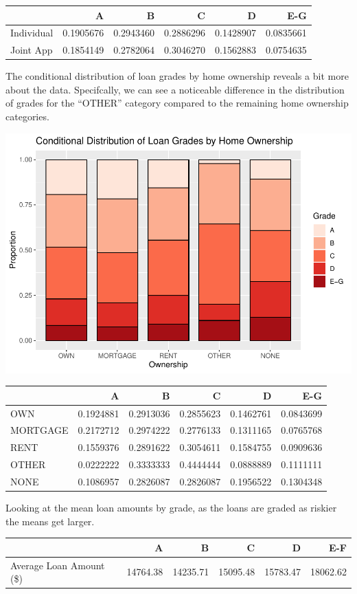 \documentclass[11pt,]{article}
\begin{document}
\begin{longtable}[]{@{}lrrrrr@{}}
\toprule
& A & B & C & D & E-G\tabularnewline
\midrule
\endhead
Individual & 0.1905676 & 0.2943460 & 0.2886296 & 0.1428907 &
0.0835661\tabularnewline
Joint App & 0.1854149 & 0.2782064 & 0.3046270 & 0.1562883 &
0.0754635\tabularnewline
\bottomrule
\end{longtable}

The conditional distribution of loan grades by home ownership reveals a
bit more about the data. Specifcally, we can see a noticeable difference
in the distribution of grades for the ``OTHER'' category compared to the
remaining home ownership categories.

\includegraphics{An-Analysis-of-LendingClub-Loan-Grades_files/figure-latex/unnamed-chunk-3-1.pdf}

\begin{longtable}[]{@{}lrrrrr@{}}
\toprule
& A & B & C & D & E-G\tabularnewline
\midrule
\endhead
OWN & 0.1924881 & 0.2913036 & 0.2855623 & 0.1462761 &
0.0843699\tabularnewline
MORTGAGE & 0.2172712 & 0.2974222 & 0.2776133 & 0.1311165 &
0.0765768\tabularnewline
RENT & 0.1559376 & 0.2891622 & 0.3054611 & 0.1584755 &
0.0909636\tabularnewline
OTHER & 0.0222222 & 0.3333333 & 0.4444444 & 0.0888889 &
0.1111111\tabularnewline
NONE & 0.1086957 & 0.2826087 & 0.2826087 & 0.1956522 &
0.1304348\tabularnewline
\bottomrule
\end{longtable}

Looking at the mean loan amounts by grade, as the loans are graded as
riskier the means get larger.

\begin{longtable}[]{@{}lrrrrr@{}}
\toprule
& A & B & C & D & E-F\tabularnewline
\midrule
\endhead
Average Loan Amount (\$) & 14764.38 & 14235.71 & 15095.48 & 15783.47 &
18062.62\tabularnewline
\bottomrule
\end{longtable}
\end{document}
